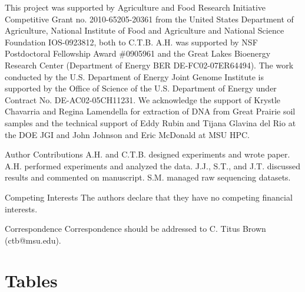 \documentclass{nature}%
\begin{document}
\begin{addendum}
\item This project was supported by Agriculture and Food Research Initiative
Competitive Grant no. 2010-65205-20361 from the United States
Department of Agriculture, National Institute of Food and Agriculture
and National Science Foundation IOS-0923812, both to C.T.B.  A.H. was
supported by NSF Postdoctoral Fellowship Award \#0905961 and the Great
Lakes Bioenergy Research Center (Department of Energy BER
DE-FC02-07ER64494).  The work conducted by the U.S. Department of
Energy Joint Genome Institute is supported by the Office of Science of
the U.S. Department of Energy under Contract No. DE-AC02-05CH11231.
We acknowledge the support of Krystle Chavarria and 
Regina Lamendella for extraction of DNA from Great Prairie soil samples
and the technical support of Eddy Rubin and Tijana Glavina del Rio 
at the DOE JGI and John Johnson and Eric McDonald at MSU HPC.  
\item[Author Contributions] A.H. and C.T.B. designed experiments and wrote paper.
A.H. performed experiments and analyzed the data.  J.J., S.T., and J.T. discussed results 
and commented on manuscript.  S.M. managed raw sequencing datasets.
\item[Competing Interests] The authors declare that they have no competing financial
interests.
\item[Correspondence] Correspondence should be addressed to C. Titus Brown (ctb@msu.edu).
\end{addendum}




\pagebreak


\section*{Tables}
\end{document}
